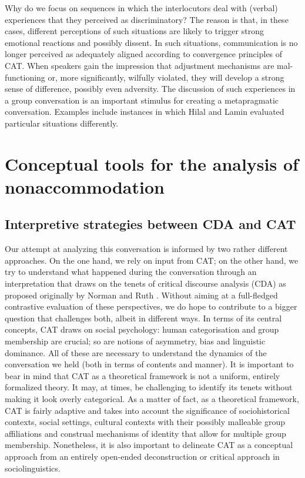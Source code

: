 \documentclass[output=paper,colorlinks,citecolor=brown]{langscibook}
\begin{document}
Why do we focus on sequences in which the interlocutors deal with (verbal) experiences that they perceived as discriminatory? The reason is that, in these cases, different perceptions of such situations are likely to trigger strong emotional reactions and possibly dissent. In such situations, communication is no longer perceived as adequately aligned according to convergence principles of CAT. When speakers gain the impression that adjustment mechanisms are mal-functioning or, more significantly, wilfully violated, they will develop a strong sense of difference, possibly even adversity. The discussion of such experiences in a group conversation is an important stimulus for creating a metapragmatic conversation. Examples include instances in which Hilal and Lamin evaluated particular situations differently. 

\section{Conceptual tools for the analysis of nonaccommodation}\label{CH1.1.ss.3}

\subsection{Interpretive strategies between CDA and CAT}\label{CH1.1.ss.3.1}

Our attempt at analyzing this conversation is informed by two rather different approaches. On the one hand, we rely on input from CAT; on the other hand, we try to understand what happened during the conversation through an interpretation that draws on the tenets of critical discourse analysis (CDA) as proposed originally by Norman \citet{fairclough1995,fairclough2013} and Ruth \citet{wodak_meyer2009}. Without aiming at a full-fledged contrastive evaluation of these perspectives, we do hope to contribute to a bigger question that challenges both, albeit in different ways. In terms of its central concepts, CAT draws on social psychology: human categorisation and group membership are crucial; so are notions of asymmetry, bias and linguistic dominance. All of these are necessary to understand the dynamics of the conversation we held (both in terms of contents and manner). It is important to bear in mind that CAT as a theoretical framework is not a uniform, entirely formalized theory. It may, at times, be challenging to identify its tenets without making it look overly categorical. As a matter of fact, as a theoretical framework, CAT is fairly adaptive and takes into account the significance of sociohistorical contexts, social settings, cultural contexts with their possibly malleable group affiliations and construal mechanisms of identity that allow for multiple group membership. Nonetheless, it is also important to delineate CAT as a conceptual approach from an entirely open-ended deconstruction or critical approach in sociolinguistics. 
\end{document}
